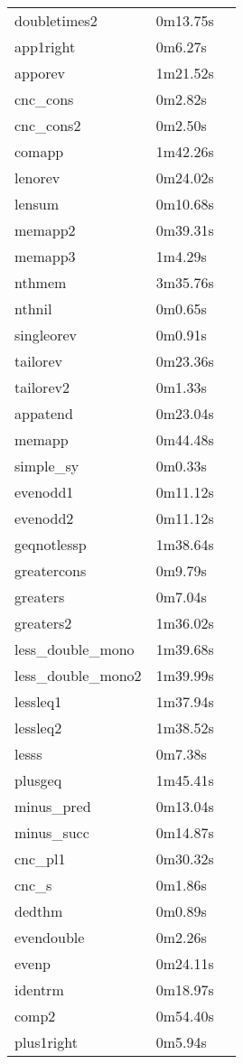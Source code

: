 \begin{center}
\begin{supertabular}[t]{llp{2in}}
doubletimes2 & 0m13.75s & \\
app1right & 0m6.27s & \\
apporev & 1m21.52s & \\
cnc\_cons & 0m2.82s & \\
cnc\_cons2 & 0m2.50s & \\
comapp & 1m42.26s & \\
lenorev & 0m24.02s & \\
lensum & 0m10.68s & \\
memapp2 & 0m39.31s & \\
memapp3 & 1m4.29s & \\
nthmem & 3m35.76s & \\
nthnil & 0m0.65s & \\
singleorev & 0m0.91s & \\
tailorev & 0m23.36s & \\
tailorev2 & 0m1.33s & \\
appatend & 0m23.04s & \\
memapp & 0m44.48s & \\
simple\_sy & 0m0.33s & \\
evenodd1 & 0m11.12s & \\
evenodd2 & 0m11.12s & \\
geqnotlessp & 1m38.64s & \\
greatercons & 0m9.79s & \\
greaters & 0m7.04s & \\
greaters2 & 1m36.02s & \\
less\_double\_mono & 1m39.68s & \\
less\_double\_mono2 & 1m39.99s & \\
lessleq1 & 1m37.94s & \\
lessleq2 & 1m38.52s & \\
lesss & 0m7.38s & \\
plusgeq & 1m45.41s & \\
minus\_pred & 0m13.04s & \\
minus\_succ & 0m14.87s & \\
cnc\_pl1 & 0m30.32s & \\
cnc\_s & 0m1.86s & \\
dedthm & 0m0.89s & \\
evendouble & 0m2.26s & \\
evenp & 0m24.11s & \\
identrm & 0m18.97s & \\
comp2 & 0m54.40s & \\
plus1right & 0m5.94s & \\

\end{supertabular}
\end{center}
